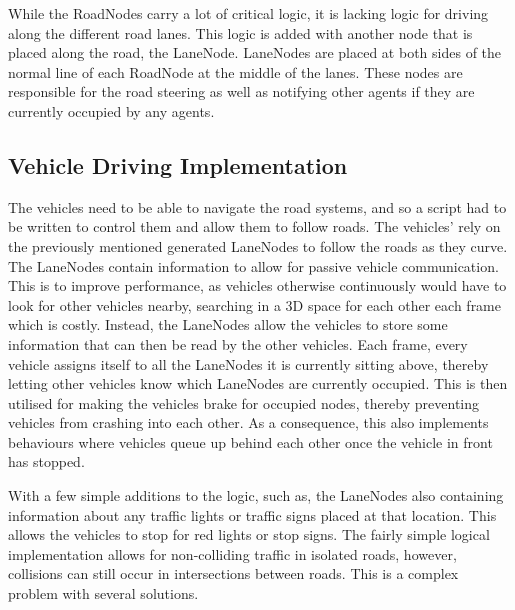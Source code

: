     
        While the RoadNodes carry a lot of critical logic, it is lacking logic for driving along the different road lanes. This logic is added with another node that is placed along the road, the LaneNode. LaneNodes are placed at both sides of the normal line of each RoadNode at the middle of the lanes. These nodes are responsible for the road steering as well as notifying other agents if they are currently occupied by any agents.
    


    \subsection{Vehicle Driving Implementation}
        The vehicles need to be able to navigate the road systems, and so a script had to be written to control them and allow them to follow roads. The vehicles' rely on the previously mentioned generated LaneNodes to follow the roads as they curve. The LaneNodes contain information to allow for passive vehicle communication. This is to improve performance, as vehicles otherwise continuously would have to look for other vehicles nearby, searching in a 3D space for each other each frame which is costly. Instead, the LaneNodes allow the vehicles to store some information that can then be read by the other vehicles. Each frame, every vehicle assigns itself to all the LaneNodes it is currently sitting above, thereby letting other vehicles know which LaneNodes are currently occupied. This is then utilised for making the vehicles brake for occupied nodes, thereby preventing vehicles from crashing into each other. As a consequence, this also implements behaviours where vehicles queue up behind each other once the vehicle in front has stopped.
    
        With a few simple additions to the logic, such as, the LaneNodes also containing information about any traffic lights or traffic signs placed at that location. This allows the vehicles to stop for red lights or stop signs. The fairly simple logical implementation allows for non-colliding traffic in isolated roads, however, collisions can still occur in intersections between roads. This is a complex problem with several solutions.
    
